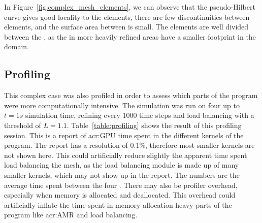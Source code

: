 In Figure~\ref{fig:complex_mesh_elements}, we can observe that the pseudo-Hilbert curve gives good
locality to the elements, there are few discontinuities between elements, and the surface area
between  is small. The elements are well divided between the
, as the  in more heavily refined areas have a smaller
footprint in the domain.

\subsection{Profiling}\label{subsection:results:complex_meshes:profiling}

This complex case was also profiled in order to assess which parts of the program were more
computationally intensive. The simulation was run on four  up to \(t = 1 s\)
simulation time, refining every \(1000\) time steps and load balancing with a threshold of \(L =
1.1\). Table~\ref{table:profiling} shows the result of this profiling session. This is a report of
\acrshort{acr:GPU} time spent in the different kernels of the program. The report has a resolution
of \(0.1 \% \), therefore most smaller kernels are not shown here. This could artificially reduce
slightly the apparent time spent load balancing the mesh, as the load balancing module is made up of
many smaller kernels, which may not show up in the report. The numbers are the average time spent
between the four . There may also be profiler overhead, especially when memory
is allocated and deallocated. This overhead could artificially inflate the time spent in memory
allocation heavy parts of the program like \acrshort{acr:AMR} and load balancing.

